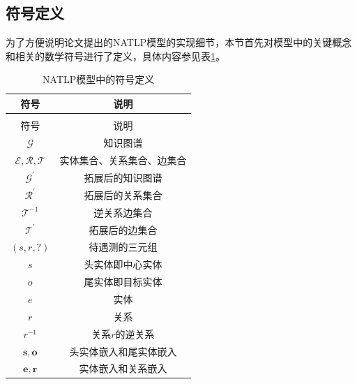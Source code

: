 \subsection{符号定义}

为了方便说明论文提出的NATLP模型的实现细节，本节首先对模型中的关键概念和相关的数学符号进行了定义，具体内容参见表\ref{definition}。

\setlength{\tabcolsep}{20pt}

\renewcommand\arraystretch{1.5}
\begin{longtable}[htbp]{cc}
  \caption{NATLP模型中的符号定义}
  \label{definition}\\
  \toprule
  符号  & 说明\\
  \midrule
  \endfirsthead
  \caption{NATLP模型中的符号定义}\\
  \toprule
  符号  & 说明 \\
  \midrule
  \endhead
  \hline
  \endfoot
  \bottomrule
  \endlastfoot
  
  $\mathcal{G}$   &   知识图谱      \\
  $\mathcal{E}, \mathcal{R}, \mathcal{T}$   &   实体集合、关系集合、边集合      \\
  $\mathcal{G}^\prime$  &  拓展后的知识图谱      \\
  $\mathcal{R}^{\prime}$   &   拓展后的关系集合      \\
  $\mathcal{T}^{-1}$   &   逆关系边集合      \\
  $\mathcal{T}^{\prime}$   &   拓展后的边集合      \\
  $(s,r,?)$  &   待遇测的三元组      \\
  $s$   &   头实体即中心实体      \\
  $o$   &   尾实体即目标实体      \\
  $e$   &   实体      \\
  $r$   &   关系      \\
  $r^{-1}$   &   关系$r$的逆关系      \\
  $\boldsymbol{s},\boldsymbol{o}$ & 头实体嵌入和尾实体嵌入\\
  $\boldsymbol{e},\boldsymbol{r}$ & 实体嵌入和关系嵌入\\


\end{longtable}

